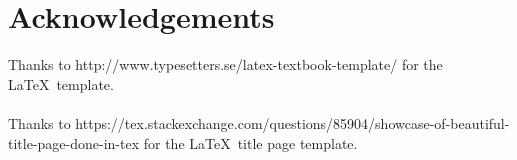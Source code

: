 \newpage
\section*{Acknowledgements}

Thanks to http://www.typesetters.se/latex-textbook-template/ for the \LaTeX \ template.
\\ \\
Thanks to https://tex.stackexchange.com/questions/85904/showcase-of-beautiful-title-page-done-in-tex for the \LaTeX \ title page template.
